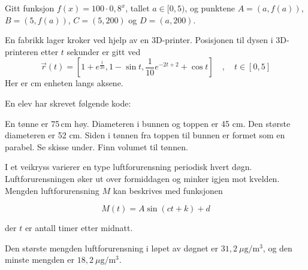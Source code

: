 Gitt funksjon $f(x) = 100 \cdot 0,8^x$, tallet $a\in[0,5)$, og punktene $A=(a, f(a))$, $B=(5, f(a))$, $C=(5, 200)$ og $D=(a, 200)$.

\newpage
{}
En fabrikk lager kroker ved hjelp av en 3D-printer. Posisjonen til dysen i 3D-printeren etter $t$ sekunder er gitt ved
\[
\vec{r}(t) = \left[1 + e^{\frac{t}{20}}, 1 - \sin t, \frac{1}{10} e^{-2t+2} + \cos t \right]\quad, \quad t \in [0, 5]
\]
Her er cm enheten langs aksene.

En elev har skrevet følgende kode:

\newpage
{}
En tønne er 75\,cm høy. Diameteren i bunnen og toppen er 45 cm.
Den største diameteren er 52 cm.
Siden i tønnen fra toppen til bunnen er formet som en parabel. Se skisse under.
Finn volumet til tønnen.


I et veikryss varierer en type luftforurensning periodisk hvert døgn.
Luftforurensningen øker ut over formiddagen og minker igjen mot kvelden.
Mengden luftforurensning $M$ kan beskrives med funksjonen

\begin{equation*}
	M(t) = A \sin(ct + k) + d
\end{equation*}

der $t$ er antall timer etter midnatt. \os

Den største mengden luftforurensning i løpet av døgnet er $31{,}2\ \mu\text{g}/\text{m}^3$,
og den minste mengden er $18{,}2\ \mu\text{g}/\text{m}^3$.


